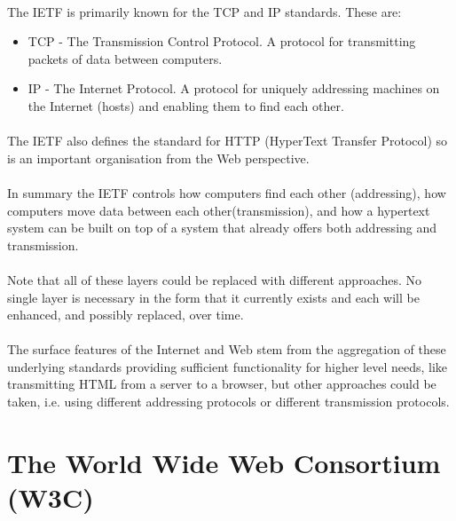 \paragraph{} The IETF is primarily known for the TCP and IP standards. These are:

\begin{itemize}
\item TCP - The Transmission Control Protocol. A protocol for transmitting packets of data between computers.
\item IP - The Internet Protocol. A protocol for uniquely addressing machines on the Internet (hosts) and enabling them to find each other.
\end{itemize}

\paragraph{} The IETF also defines the standard for HTTP (HyperText Transfer Protocol) so is an important organisation from the Web perspective. 
\paragraph{} In summary the IETF controls how computers find each other (addressing), how computers move data between each other(transmission), and how a hypertext system can be built on top of a system that already offers both addressing and transmission.
\paragraph{} Note that all of these layers could be replaced with different approaches. No single layer is necessary in the form that it currently exists and each will be enhanced, and possibly replaced, over time. 
\paragraph{} The surface features of the Internet and Web stem from the aggregation of these underlying standards providing sufficient functionality for higher level needs, like transmitting HTML from a server to a browser, but other approaches could be taken, i.e. using different addressing protocols or different transmission protocols.

\section{The World Wide Web Consortium (W3C)}

